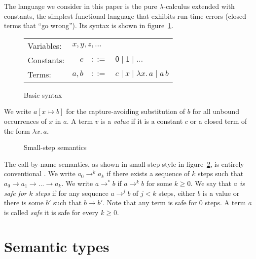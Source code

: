 \documentclass[10pt,a4paper,draft,twocolumn]{article}
\theoremstyle{definition}
\theoremstyle{plain}
\newcommand{\abstr}[2]{\ensuremath{\lambda{#1}.\,{#2}}}
\newcommand{\app}[2]{\ensuremath{{#1}\,{#2}}}
\begin{document}
The language we consider in this paper is the pure $\lambda$-calculus extended with constants,
the simplest functional language that exhibits run-time errors (closed terms that ``go wrong'').
Its syntax is shown in figure~\ref{fig:Basic_syntax}.
\begin{figure}[htb]
  \centering
  \begin{tabular}{lrcl}
    Variables: & \multicolumn{3}{l}{$x,y,z,\ldots$} \\
    Constants: & $c$ & $::=$ & $\mathsf{0} \mid \mathsf{1} \mid \ldots$ \\
    Terms: & $a,b$ & $::=$ & $c \mid x \mid \abstr{x}{a} \mid \app{a}{b}$
  \end{tabular}
  \caption{Basic syntax}
  \label{fig:Basic_syntax}
\end{figure}
We write $a[x \mapsto b]$ for the capture-avoiding substitution of $b$ for all unbound occurrences
of $x$ in $a$. A term $v$ is a \emph{value} if it is a constant $c$ or a closed term of the form
$\abstr{x}{a}$.
\begin{figure}[htb]
  \centering
  \caption{Small-step semantics}
  \label{fig:Small_step_semantics}
\end{figure}
The call-by-name semantics, as shown in small-step style in figure~\ref{fig:Small_step_semantics}, is entirely
conventional \cite{Pierce02}. We write $a_0 \to^k a_k$ if there exists a sequence of $k$ steps such that
$a_0 \to a_1 \to \ldots \to a_k$. We write $a \to^* b$ if $a \to^k b$ for some $k \ge 0$. We say that
\emph{$a$ is safe for $k$ steps} if for any sequence $a \to^j b$ of $j < k$ steps, either $b$ is a value
or there is some $b'$ such that $b \to b'$. Note that any term is safe for $0$ steps. A term $a$ is called
\emph{safe} it is safe for every $k \ge 0$.


\section{Semantic types}
\label{sec:Semantic_types}
\end{document}
